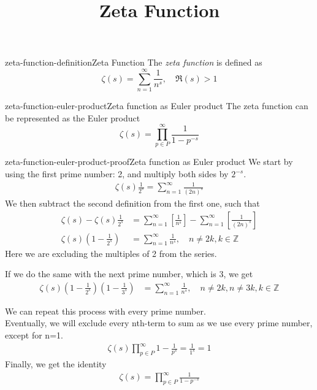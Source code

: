 \documentclass[preview]{standalone}
\begin{document}
\title{Zeta Function}
\genpage

\begin{snippetdefinition}{zeta-function-definition}{Zeta Function}
    The \textit{zeta function} is defined as
    \[
        \zeta(s)=\sum_{n=1}^{\infty}\frac{1}{n^s},\quad \Re(s)>1
    \]
\end{snippetdefinition}

\begin{snippettheorem}{zeta-function-euler-product}{Zeta function as Euler product}
    The zeta function can be represented as the Euler product
    \[
        \zeta(s)=\prod_{p\in P}^{\infty}\frac{1}{1-p^{-s}}
    \]
\end{snippettheorem}

\begin{snippetproof}{zeta-function-euler-product-proof}{Zeta function as Euler product}
    We start by using the first prime number: 2, and multiply both sides by \(2^{-s}\).
    \begin{align*}
        \zeta(s)\frac{1}{2^s}=\sum_{n=1}^{\infty}\frac{1}{{(2n)}^s}
    \end{align*}
    We then subtract the second definition from the first one, such that
    \begin{align*}
        \zeta(s)-\zeta(s)\frac{1}{2^s}&=
        \sum_{n=1}^{\infty}\left[\frac{1}{n^s}\right]-
        \sum_{n=1}^{\infty}\left[\frac{1}{{(2n)}^s}\right]
        \\
        \zeta(s)\left(1-\frac{1}{2^s}\right)&=
        \sum_{n=1}^{\infty}\frac{1}{n^s},
        \quad n\neq 2k,k\in \mathbb{Z}
    \end{align*}
    Here we are excluding the multiples of 2 from the series.
    
    If we do the same with the next prime number, which is 3, we get
    \begin{align*}
        \zeta(s)\left(1-\frac{1}{2^s}\right)\left(1-\frac{1}{3^s}\right)&=
        \sum_{n=1}^{\infty}\frac{1}{n^s},
        \quad n\neq 2k,n\neq 3k, k\in \mathbb{Z}
    \end{align*}
    
    We can repeat this process with every prime number.
    \\
    Eventually, we will exclude every nth-term to sum as we use every prime number, except for n=1.
    \begin{align*}
        \zeta(s)\prod_{p\in P}^{\infty}1-\frac{1}{p^s}=\frac{1}{1^s}=1
    \end{align*}
    Finally, we get the identity
    \begin{align*}
        \zeta(s)=
        \prod_{p\in P}^{\infty}\frac{1}{1-p^{-s}}
    \end{align*}
\end{snippetproof}
\end{document}

